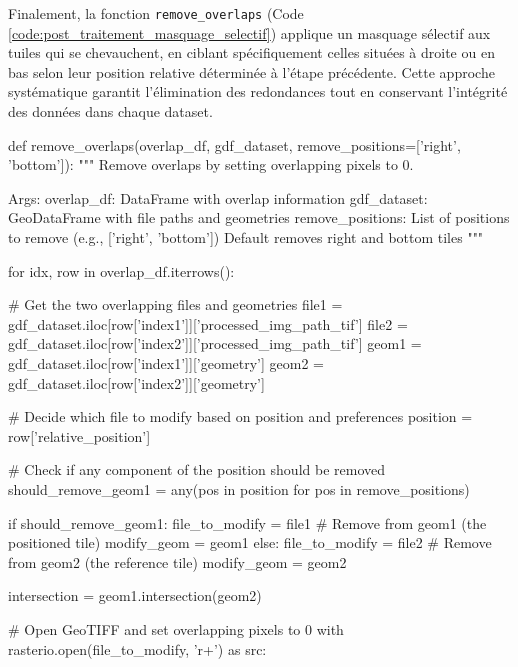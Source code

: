 Finalement, la fonction \texttt{remove\_overlaps} (Code \ref{code:post_traitement_masquage_selectif}) applique un masquage sélectif aux tuiles qui se chevauchent, en ciblant spécifiquement celles situées à droite ou en bas selon leur position relative déterminée à l'étape précédente. Cette approche systématique garantit l'élimination des redondances tout en conservant l'intégrité des données dans chaque dataset.

\begin{code}[H]
    \begin{pythoncode}
    def remove_overlaps(overlap_df, gdf_dataset, remove_positions=['right', 'bottom']):
        """
        Remove overlaps by setting overlapping pixels to 0.
        
        Args:
            overlap_df: DataFrame with overlap information
            gdf_dataset: GeoDataFrame with file paths and geometries
            remove_positions: List of positions to remove (e.g., ['right', 'bottom'])
                             Default removes right and bottom tiles
        """
        
        for idx, row in overlap_df.iterrows():
            
            # Get the two overlapping files and geometries
            file1 = gdf_dataset.iloc[row['index1']]['processed_img_path_tif']
            file2 = gdf_dataset.iloc[row['index2']]['processed_img_path_tif'] 
            geom1 = gdf_dataset.iloc[row['index1']]['geometry']
            geom2 = gdf_dataset.iloc[row['index2']]['geometry']
            
            # Decide which file to modify based on position and preferences
            position = row['relative_position']
            
            # Check if any component of the position should be removed
            should_remove_geom1 = any(pos in position for pos in remove_positions)
            
            if should_remove_geom1:
                file_to_modify = file1    # Remove from geom1 (the positioned tile)
                modify_geom = geom1
            else:
                file_to_modify = file2    # Remove from geom2 (the reference tile)
                modify_geom = geom2
                
            intersection = geom1.intersection(geom2)
            
            # Open GeoTIFF and set overlapping pixels to 0
            with rasterio.open(file_to_modify, 'r+') as src:
                

\end{pythoncode}
\end{code}
